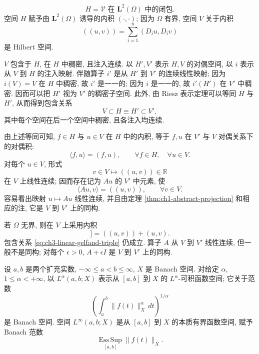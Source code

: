 \hypertarget{chapter-03-page-183}{}
\begin{equation}
H=\mathcal V\text{ 在 }\mathbf L^2(\Omega)\text{ 中的闭包}.
\label{eq:ch3-linear-h-space}
\end{equation}
空间 $H$ 赋予由 $\mathbf L^2(\Omega)$ 诱导的内积 $(\cdot,\cdot)$; 因为 $\Omega$ 有界, 空间 $V$ 关于内积
\begin{equation}
((u,v))=\sum_{i=1}^{n}(D_i u,D_i v)
\label{eq:ch3-linear-v-inner-product}
\end{equation}
是 Hilbert 空间.

$V$ 包含于 $H$, 在 $H$ 中稠密, 且注入连续. 以 $H',V'$ 表示 $H,V$ 的对偶空间, 以 $i$ 表示从 $V$ 到 $H$ 的注入映射. 伴随算子 $i'$ 是从 $H'$ 到 $V'$ 的连续线性映射; 因为 $i(V)=V$ 在 $H$ 中稠密, 故 $i'$ 是一一的; 因为 $i$ 是一一的, 故 $i'(H')$ 在 $V'$ 中稠密. 因而可以把 $H'$ 视为 $V'$ 的稠密子空间. 此外, 由 Riesz 表示定理可以等同 $H$ 与 $H'$, 从而得到包含关系
\begin{equation}
V\subset H\equiv H'\subset V',
\label{eq:ch3-linear-gelfand-triple}
\end{equation}
其中每个空间在后一个空间中稠密, 且各注入均连续.

由上述等同可知, $f\in H$ 与 $u\in V$ 在 $H$ 中的内积, 等于 $f,u$ 在 $V'$ 与 $V$ 对偶关系下的对偶积:
\begin{equation}
\langle f,u\rangle=(f,u),
\qquad\forall f\in H,\quad\forall u\in V.
\label{eq:ch3-linear-duality-inner-product}
\end{equation}
对每个 $u\in V$, 形式
\begin{equation}
v\in V\longmapsto((u,v))\in\mathbb R
\label{eq:ch3-linear-form-on-v}
\end{equation}
在 $V$ 上线性连续; 因而存在记为 $Au$ 的 $V'$ 中元素, 使
\begin{equation}
\langle Au,v\rangle=((u,v)),
\qquad\forall v\in V.
\label{eq:ch3-linear-operator-a}
\end{equation}
容易看出映射 $u\mapsto Au$ 线性连续, 并且由定理 \ref{thm:ch1-abstract-projection} 和相应的注, 它是 $V$ 到 $V'$ 上的同构.

若 $\Omega$ 无界, 则在 $V$ 上采用内积
\begin{equation}
[[u,v]]=((u,v))+(u,v).
\label{eq:ch3-linear-unbounded-v-inner-product}
\end{equation}
包含关系 \eqref{eq:ch3-linear-gelfand-triple} 仍成立. 算子 $A$ 从 $V$ 到 $V'$ 线性连续, 但一般不是同构; 对每个 $\epsilon>0$, $A+\epsilon I$ 是 $V$ 到 $V'$ 上的同构.

设 $a,b$ 是两个扩充实数, $-\infty\leq a<b\leq\infty$, $X$ 是 Banach 空间. 对给定 $\alpha$, $1\leq\alpha<+\infty$, 以 $L^\alpha(a,b;X)$ 表示从 $[a,b]$ 到 $X$ 的 $L^\alpha$-可积函数空间; 它关于范数
\begin{equation}
\left(\int_a^b\lVert f(t)\rVert_X^\alpha\,dt\right)^{1/\alpha}
\label{eq:ch3-linear-bochner-lp-norm}
\end{equation}
是 Banach 空间. 空间 $L^\infty(a,b;X)$ 是从 $[a,b]$ 到 $X$ 的本质有界函数空间, 赋予 Banach 范数
\begin{equation}
\operatorname*{Ess\,Sup}_{[a,b]}\lVert f(t)\rVert_X.
\label{eq:ch3-linear-bochner-linfty-norm}
\end{equation}

